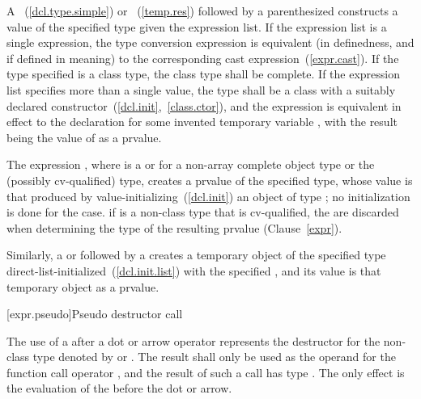 \pnum
{}
%
%
%
%
A ~(\ref{dcl.type.simple}) or
~(\ref{temp.res}) followed by a
parenthesized  constructs a value of the
specified type given the expression list. If the expression list is a
single expression, the type conversion expression is equivalent (in
definedness, and if defined in meaning) to the corresponding cast
expression~(\ref{expr.cast}).
%
If the type specified is a class type, the
class type shall be complete. If the expression list specifies more than
a single value, the type shall be a class with a suitably declared
constructor~(\ref{dcl.init},~\ref{class.ctor}), and the expression
 is equivalent in effect to the declaration
 for some invented temporary variable
, with the result being the value of  as a prvalue.

\pnum
The expression , where  is a
 or  for a non-array complete object
type or the (possibly cv-qualified)  type, creates a prvalue of the
specified type, whose value is that produced by
value-initializing~(\ref{dcl.init}) an object of type ; no
initialization is done for the  case.
\enternote 
if  is a non-class type that is cv-qualified, the
 are discarded when determining the type of the
resulting prvalue (Clause~\ref{expr}).
\exitnote 

\pnum
Similarly, a  or
 followed by a 
creates a temporary object of the specified type
direct-list-initialized~(\ref{dcl.init.list}) with the specified
, and its value is that temporary object as a
prvalue.

[expr.pseudo]{Pseudo destructor call}

\pnum
{}
%
%
The use of a  after a dot  or
arrow \tcode{->} operator represents the destructor for the non-class
type denoted by  or .
The result shall only be used as the
operand for the function call operator \tcode{()}, and the result of
such a call has type . The only effect is the evaluation of
the  before the dot or arrow.

